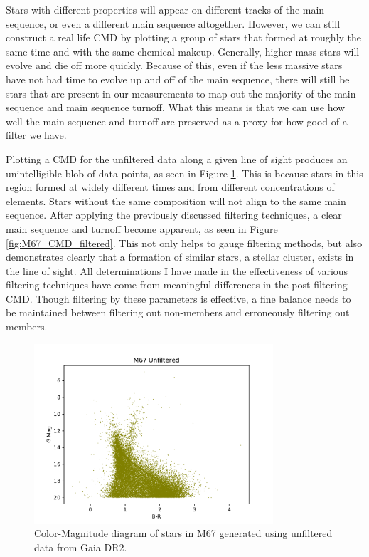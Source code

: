 \documentclass[aps,prb,twocolumn,groupedaddress,nofootinbib,floatfix]{revtex4-1}
\begin{document}
Stars with different properties will appear on different tracks of the main sequence, or even a different main sequence altogether. However, we can still construct a real life CMD by plotting a group of stars that formed at roughly the same time and with the same chemical makeup. Generally, higher mass stars will evolve and die off more quickly. Because of this, even if the less massive stars have not had time to evolve up and off of the main sequence, there will still be stars that are present in our measurements to map out the majority of the main sequence and main sequence turnoff. What this means is that we can use how well the main sequence and turnoff are preserved as a proxy for how good of a filter we have.

Plotting a CMD for the unfiltered data along a given line of sight produces an unintelligible blob of data points, as seen in Figure \ref{fig:M67_CMD_unfiltered}. This is because stars in this region formed at widely different times and from different concentrations of elements. Stars without the same composition will not align to the same main sequence. After applying the previously discussed filtering techniques, a clear main sequence and turnoff become apparent, as seen in Figure \ref{fig:M67_CMD_filtered}. This not only helps to gauge filtering methods, but also demonstrates clearly that a formation of similar stars, a stellar cluster, exists in the line of sight. All determinations I have made in the effectiveness of various filtering techniques have come from meaningful differences in the post-filtering CMD. Though filtering by these parameters is effective, a fine balance needs to be maintained between filtering out non-members and erroneously filtering out members.

\begin{figure}[!h]
	\centering
      \includegraphics[width=3.5in]{M67_CMD_unfiltered.pdf}
	\caption{Color-Magnitude diagram of stars in M67 generated using unfiltered data from Gaia DR2.}
	\label{fig:M67_CMD_unfiltered}
\end{figure}
\end{document}
